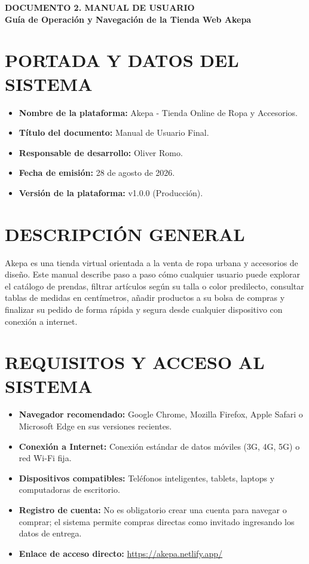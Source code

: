 \documentclass[12pt]{article}
\begin{document}
\clearpage

\begin{center}
    {\Large \textbf{\color{azulpuce}DOCUMENTO 2. MANUAL DE USUARIO}}\\[0.2cm]
    {\large \textbf{Guía de Operación y Navegación de la Tienda Web Akepa}}
\end{center}

\section*{PORTADA Y DATOS DEL SISTEMA}
\begin{itemize}
    \item \textbf{Nombre de la plataforma:} Akepa - Tienda Online de Ropa y Accesorios.
    \item \textbf{Título del documento:} Manual de Usuario Final.
    \item \textbf{Responsable de desarrollo:} Oliver Romo.
    \item \textbf{Fecha de emisión:} 28 de agosto de 2026.
    \item \textbf{Versión de la plataforma:} v1.0.0 (Producción).
\end{itemize}

\section*{DESCRIPCIÓN GENERAL}
Akepa es una tienda virtual orientada a la venta de ropa urbana y accesorios de diseño. Este manual describe paso a paso cómo cualquier usuario puede explorar el catálogo de prendas, filtrar artículos según su talla o color predilecto, consultar tablas de medidas en centímetros, añadir productos a su bolsa de compras y finalizar su pedido de forma rápida y segura desde cualquier dispositivo con conexión a internet.

\section*{REQUISITOS Y ACCESO AL SISTEMA}
\begin{itemize}
    \item \textbf{Navegador recomendado:} Google Chrome, Mozilla Firefox, Apple Safari o Microsoft Edge en sus versiones recientes.
    \item \textbf{Conexión a Internet:} Conexión estándar de datos móviles (3G, 4G, 5G) o red Wi-Fi fija.
    \item \textbf{Dispositivos compatibles:} Teléfonos inteligentes, tablets, laptops y computadoras de escritorio.
    \item \textbf{Registro de cuenta:} No es obligatorio crear una cuenta para navegar o comprar; el sistema permite compras directas como invitado ingresando los datos de entrega.
    \item \textbf{Enlace de acceso directo:} \href{https://akepa.netlify.app/}{https://akepa.netlify.app/}
\end{itemize}
\end{document}
